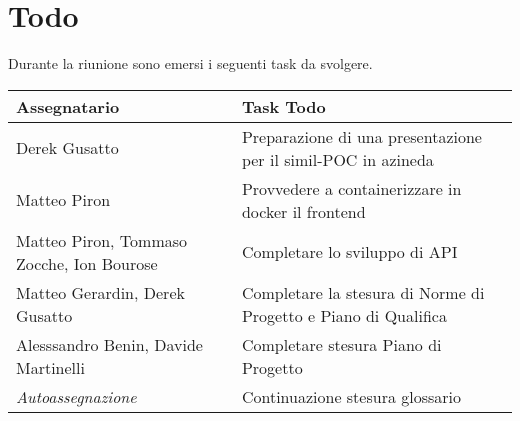 \section{Todo}
Durante la riunione sono emersi i seguenti task da svolgere.

\begin{center}
  \begin{tabular}{|p{5cm}|p{8cm}|}
    \hline
    \textbf{Assegnatario}       & \textbf{Task Todo} \\ \hline
    Derek Gusatto & Preparazione di una presentazione per il simil-POC in azineda  \\ \hline
    Matteo Piron & Provvedere a containerizzare in docker il frontend  \\ \hline
    Matteo Piron, Tommaso Zocche, Ion Bourose & Completare lo sviluppo di API \\ \hline
    Matteo Gerardin, Derek Gusatto & Completare la stesura di Norme di Progetto e Piano di Qualifica \\ \hline
    Alesssandro Benin, Davide Martinelli & Completare stesura Piano di Progetto \\ \hline
    \textit{Autoassegnazione} & Continuazione stesura glossario \\ \hline
  \end{tabular}
\end{center}